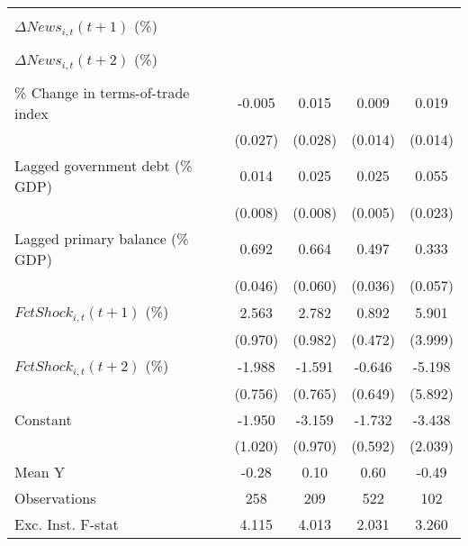{\begin{tabular}{l*{4}{c}}
                    &                     &                     &                     &                     \\
\addlinespace
$ \Delta News_{i,t}(t+1)$ (\%)&                     &                     &                     &                     \\
                    &                     &                     &                     &                     \\
\addlinespace
$ \Delta News_{i,t}(t+2)$ (\%)&                     &                     &                     &                     \\
                    &                     &                     &                     &                     \\
\addlinespace
\% Change in terms-of-trade index&      -0.005         &       0.015         &       0.009         &       0.019         \\
                    &     (0.027)         &     (0.028)         &     (0.014)         &     (0.014)         \\
\addlinespace
Lagged government debt (\% GDP)&       0.014\sym{*}  &       0.025\sym{***}&       0.025\sym{***}&       0.055\sym{**} \\
                    &     (0.008)         &     (0.008)         &     (0.005)         &     (0.023)         \\
\addlinespace
Lagged primary balance (\% GDP)&       0.692\sym{***}&       0.664\sym{***}&       0.497\sym{***}&       0.333\sym{***}\\
                    &     (0.046)         &     (0.060)         &     (0.036)         &     (0.057)         \\
\addlinespace
$ FctShock_{i,t}(t+1)$ (\%)&       2.563\sym{**} &       2.782\sym{**} &       0.892\sym{*}  &       5.901         \\
                    &     (0.970)         &     (0.982)         &     (0.472)         &     (3.999)         \\
\addlinespace
$ FctShock_{i,t}(t+2)$ (\%)&      -1.988\sym{**} &      -1.591\sym{*}  &      -0.646         &      -5.198         \\
                    &     (0.756)         &     (0.765)         &     (0.649)         &     (5.892)         \\
\addlinespace
Constant            &      -1.950\sym{*}  &      -3.159\sym{***}&      -1.732\sym{***}&      -3.438         \\
                    &     (1.020)         &     (0.970)         &     (0.592)         &     (2.039)         \\
\midrule
Mean Y              &       -0.28         &        0.10         &        0.60         &       -0.49         \\
Observations        &         258         &         209         &         522         &         102         \\
Exc. Inst. F-stat   &       4.115         &       4.013         &       2.031         &       3.260         \\
\bottomrule
\end{tabular}
}
